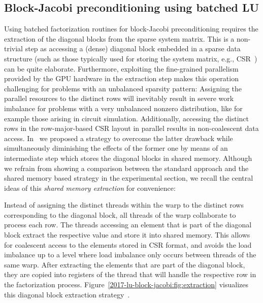 \subsection{Block-Jacobi preconditioning using batched LU}
Using batched factorization routines for block-Jacobi preconditioning
requires the extraction of the diagonal blocks from the sparse system matrix. 
This is a non-trivial step as accessing a (dense) diagonal block embedded in a 
sparse data structure (such as those typically used for storing the system matrix, e.g., CSR~\cite{saad})
can be quite elaborate. Furthermore, exploiting the fine-grained parallelism
provided by the GPU hardware in the extraction step makes this operation
challenging for problems with an unbalanced sparsity pattern:
Assigning the parallel resources to the distinct rows will inevitably result in severe
work imbalance for problems with a very unbalanced nonzero distribution, 
like for example those arising in circuit simulation.
Additionally, accessing the distinct rows in the row-major-based CSR layout in parallel
results in non-coalescent data access.
In~\cite{gje} we proposed a strategy to overcome the latter drawback while 
simultaneously diminishing the effects of the former one by means of 
an intermediate step which stores the diagonal blocks in shared memory.
Although we refrain 
from showing a comparison between the standard approach and the shared memory based
strategy in the experimental section, we recall the central ideas of this \textit{shared memory extraction} 
for convenience:


Instead of assigning the distinct threads within the warp to the distinct rows
corresponding to the diagonal block,
all threads of the warp collaborate to process each row.
The threads accessing an element that is part of the diagonal block extract the respective value
and store it into shared memory. This allows for coalescent access to the elements 
stored in CSR format, and avoids the load imbalance up to a level where load imbalance 
only occurs between threads of the same warp.
After extracting the elements that are part of the diagonal block,
they are copied into registers of the thread
that will handle the respective row in the factorization process.
Figure~\ref{2017-lu-block-jacobi:fig:extraction} visualizes this
diagonal block extraction strategy~\cite{gje}.


